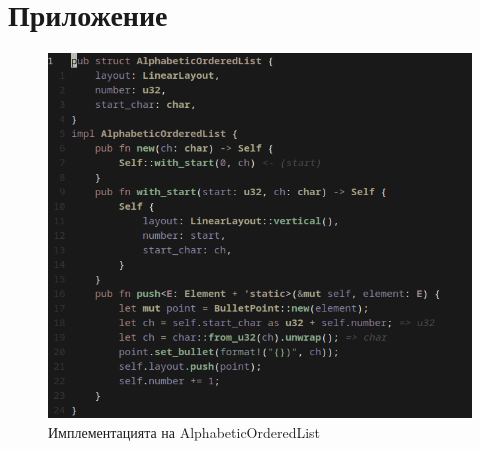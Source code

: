 \documentclass[12pt]{article}
\begin{document}
\begin{spacing}{1.0}

\end{spacing}

\newpage

\begin{spacing}{1.0}
\tableofcontents
\end{spacing}







\begin{spacing}{1.20}
\printbibliography %
\end{spacing}

\section{Приложение}
\begin{figure}[!htb]
  \includegraphics[scale=0.60]{genpdf-list.png}
  \centering
  \caption{Имплементацията на AlphabeticOrderedList}
  \label{fig:genpdf-list}
\end{figure}
\end{document}
